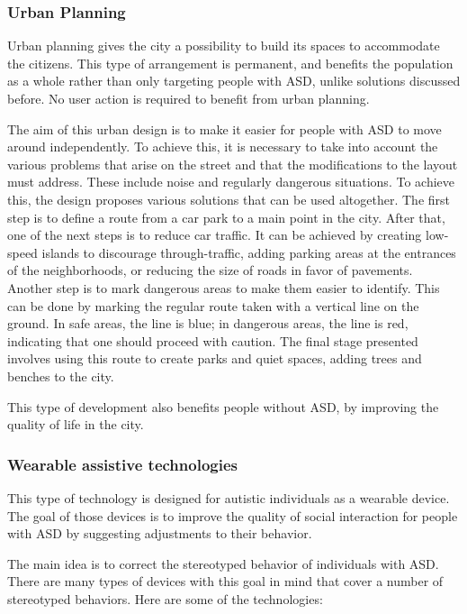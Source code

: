 \subsubsection{Urban Planning}

Urban planning gives the city a possibility to build its spaces to accommodate the citizens. This type of arrangement is permanent, and benefits the population as a whole rather than only targeting people with ASD, unlike solutions discussed before. No user action is required to benefit from urban planning.

The aim of this urban design is to make it easier for people with ASD to move around independently\cite{2018MobilityPoliciesExtraSmall}. To achieve this, it is necessary to take into account the various problems that arise on the street and that the modifications to the layout must address. These include noise and regularly dangerous situations. To achieve this, the design proposes various solutions that can be used altogether. The first step is to define a route from a car park to a main point in the city. After that, one of the next steps is to reduce car traffic. It can be achieved by creating low-speed islands to discourage through-traffic, adding parking areas at the entrances of the neighborhoods, or reducing the size of roads in favor of pavements. Another step is to mark dangerous areas to make them easier to identify. This can be done by marking the regular route taken with a vertical line on the ground. In safe areas, the line is blue; in dangerous areas, the line is red, indicating that one should proceed with caution. The final stage presented involves using this route to create parks and quiet spaces, adding trees and benches to the city.

This type of development also benefits people without ASD, by improving the quality of life in the city\cite{2018MobilityPoliciesExtraSmall}.

\subsubsection{Wearable assistive technologies}

This type of technology is designed for autistic individuals as a wearable device. The goal of those devices is to improve the quality of social interaction for people with ASD by suggesting adjustments to their behavior.

The main idea is to correct the stereotyped behavior of individuals with ASD\cite{2018WearableAssistiveTechnologies}. There are many types of devices with this goal in mind that cover a number of stereotyped behaviors. Here are some of the technologies:

